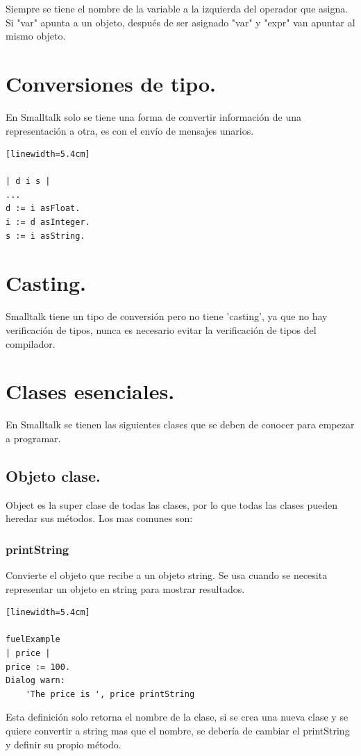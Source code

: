 \documentclass[10pt,journal,compsoc]{IEEEtran}
\begin{document}
Siempre se tiene el nombre de la variable a la izquierda del operador que asigna.
Si "var" apunta a un objeto, despu\'es de ser asignado "var" y "expr" van apuntar al mismo objeto.

\section{Conversiones de tipo.}
En Smalltalk solo se tiene una forma de convertir informaci\'on de una representaci\'on a otra, es con el env\'io de mensajes unarios.
\begin{lstlisting}[language=Smalltalk, caption = {Ejemplo de conversiones.}][linewidth=5.4cm]

| d i s |
...
d := i asFloat.
i := d asInteger.
s := i asString.

\end{lstlisting}

\section{Casting.}
Smalltalk tiene un tipo de conversi\'on pero no tiene 'casting', ya que no hay verificaci\'on de tipos, nunca es necesario evitar la verificaci\'on de tipos del compilador.

\section{Clases esenciales.}
En Smalltalk se tienen las siguientes clases que se deben de conocer para empezar a programar.

\subsection{Objeto clase.}
Object es la super clase de todas las clases, por lo que todas las clases pueden heredar sus m\'etodos. Los mas comunes son: 

\subsubsection{printString}
Convierte el objeto que recibe a un objeto string. Se usa cuando se necesita representar un objeto en string para mostrar resultados.

\begin{lstlisting}[language=Smalltalk, caption = {C\'odigo para representar un objeto en string.}][linewidth=5.4cm]

fuelExample
| price |
price := 100.
Dialog warn: 
	'The price is ', price printString

\end{lstlisting}
Esta definici\'on solo retorna el nombre de la clase, si se crea una nueva clase y se quiere convertir a string mas que el nombre, se deber\'ia de cambiar el printString y definir su propio m\'etodo.
\end{document}
